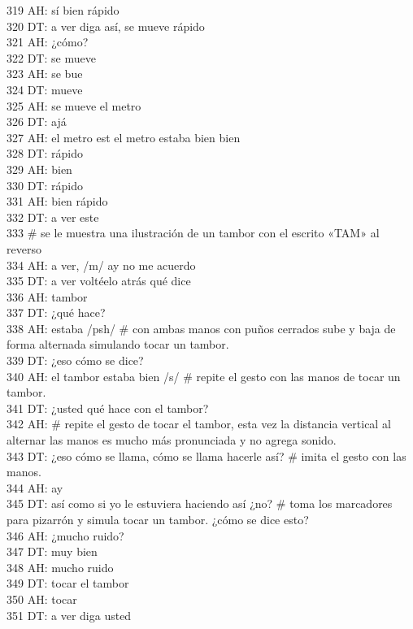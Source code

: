 319 AH: sí bien rápido\\
320 DT: a ver diga así, se mueve rápido\\
321 AH: ¿cómo?\\
322 DT: se mueve\\
323 AH: se bue\\
324 DT: mueve\\
325 AH: se mueve el metro\\
326 DT: ajá\\
327 AH: el metro est el metro estaba bien bien \\
328 DT: rápido\\
329 AH: bien\\
330 DT: rápido\\
331 AH: bien rápido\\
332 DT: a ver este\\
333 \# se le muestra una ilustración de un tambor con el escrito «TAM» al reverso\\
334 AH: a ver, /m/ ay no me acuerdo\\
335 DT: a ver voltéelo atrás qué dice\\
336 AH: tambor\\
337 DT: ¿qué hace?\\
338 AH: estaba /psh/ \# con ambas manos con puños cerrados sube y baja de forma alternada simulando tocar un tambor. \\
339 DT: ¿eso cómo se dice?\\
340 AH: el tambor estaba bien /s/ \# repite el gesto con las manos de tocar un tambor.\\
341 DT: ¿usted qué hace con el tambor?\\
342 AH: \# repite el gesto de tocar el tambor, esta vez la distancia vertical al alternar las manos es mucho más pronunciada y no agrega sonido.\\
343 DT: ¿eso cómo se llama, cómo se llama hacerle así? \# imita el gesto con las manos.\\
344 AH: ay\\
345 DT: así como si yo le estuviera haciendo así ¿no? \# toma los marcadores para pizarrón y simula tocar un tambor. ¿cómo se dice esto?\\
346 AH: ¿mucho ruido?\\
347 DT: muy bien\\
348 AH: mucho ruido\\
349 DT: tocar el tambor\\
350 AH: tocar\\
351 DT: a ver diga usted\\
